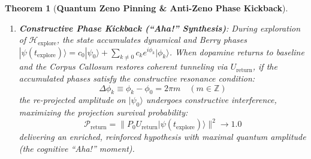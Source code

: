 \documentclass[10pt,twocolumn,3p]{article}
\newtheorem{theorem}{Theorem}
\begin{document}
\begin{theorem}[\textbf{Quantum Zeno Pinning \& Anti-Zeno Phase Kickback}]
\begin{enumerate}
    \item \textbf{Constructive Phase Kickback (``Aha!'' Synthesis)}:
    During exploration of $\mathcal{H}_{\text{explore}}$, the state accumulates dynamical and Berry phases $|\psi(t_{\text{explore}})\rangle = c_0 |\psi_0\rangle + \sum_{k \neq 0} c_k e^{i \phi_k} |\phi_k\rangle$. When dopamine returns to baseline and the Corpus Callosum restores coherent tunneling via $U_{\text{return}}$, if the accumulated phases satisfy the constructive resonance condition:
    \begin{equation}
        \Delta \phi_k \equiv \phi_k - \phi_0 = 2\pi m \quad (m \in \mathbb{Z})
    \end{equation}
    the re-projected amplitude on $|\psi_0\rangle$ undergoes constructive interference, maximizing the projection survival probability:
    \begin{equation}
        \mathcal{P}_{\text{return}} = \| P_0 U_{\text{return}} |\psi(t_{\text{explore}})\rangle \|^2 \to 1.0
        \label{eq:phase_kickback}
    \end{equation}
    delivering an enriched, reinforced hypothesis with maximal quantum amplitude (the cognitive ``Aha!'' moment).
\end{enumerate}
\end{theorem}
\end{document}
